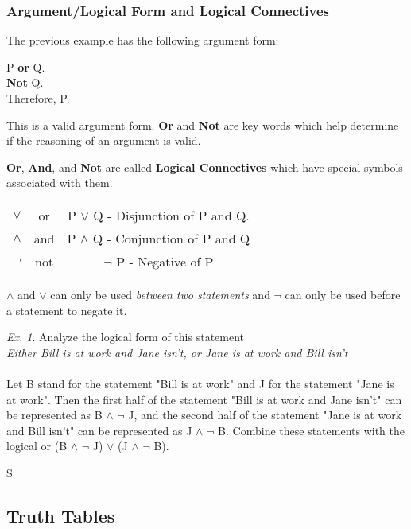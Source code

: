 \documentclass[11pt]{article}
\theoremstyle{definition}
\theoremstyle{remark}
\newtheorem{exer}{Ex.}
\begin{document}
\subsubsection{Argument/Logical Form and Logical Connectives}
The previous example has the following argument form:
\begin{center}
P \textbf{or} Q.\\ \textbf{Not} Q.\\Therefore, P.
\end{center}
This is a valid argument form. \newline
\textbf{Or} and \textbf{Not} are key words which help determine if the reasoning of an argument is valid.

\textbf{Or}, \textbf{And}, and \textbf{Not} are called \textbf{Logical Connectives} which have special symbols associated with them.


\begin{center}
\begin{tabular}{ c | c | c }
    $\lor$ & or & P $\lor$ Q - Disjunction of P and Q.\\
    $\land$ & and & P $\land$ Q - Conjunction of P and Q\\
    $\neg$ & not & $\neg$ P - Negative of P
\end{tabular}
\end{center}
$\land$ and $\lor$ can only be used \textit{between two statements} and $\neg$ can only be used before a statement to negate it.

\begin{exer}
    Analyze the logical form of this statement \\
    \textit{Either Bill is at work and Jane isn't, or Jane is at work and Bill isn't}\\ \\
    Let B stand for the statement "Bill is at work" and J for the statement "Jane is at work". 
    Then the first half of the statement "Bill is at work and Jane isn't" can be represented as
    B $\land$ $\neg$ J, and the second half of the statement "Jane is at work and Bill isn't" can be represented as J $\land$ $\neg$ B.
    Combine these statements with the logical or (B $\land$ $\neg$ J) $\lor$ (J $\land$ $\neg$ B). 
\end{exer}S
\subsection{Truth Tables}
\end{document}
